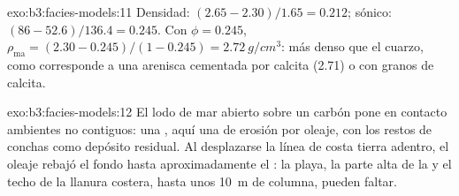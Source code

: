 \begin{solution}{exo:b3:facies-models:11}
Densidad: $(2.65 - 2.30)/1.65 = 0.212$; sónico: $(86 - 52.6)/136.4 = 0.245$.
Con $\phi = 0.245$, $\rho_{\mathrm{ma}} = (2.30 - 0.245)/(1 - 0.245) =
\qty{2.72}{g/cm^3}$: más denso que el cuarzo, como corresponde a una arenisca cementada por
calcita (2.71) o con granos de calcita.
\end{solution}

\begin{solution}{exo:b3:facies-models:12}
El lodo de mar abierto sobre un carbón pone en contacto ambientes no contiguos: una
, aquí una  de erosión por oleaje, con los restos de conchas
como depósito residual. Al desplazarse la línea de costa tierra adentro, el oleaje rebajó el fondo
hasta aproximadamente el : la playa, la parte alta de la  y el
techo de la llanura costera, hasta unos \qty{10}{m} de columna, pueden
faltar.
\end{solution}

